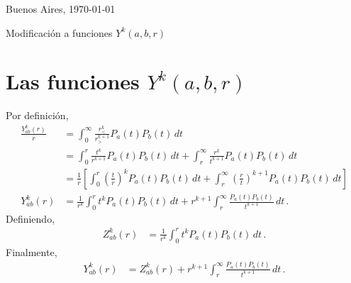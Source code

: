 \documentclass[11pt]{article}
\begin{document}
\hfill{Buenos Aires, \today} \\

\begin{center}
Modificación a funciones $Y^k(a,b,r)$ 
\end{center}

\section{Las funciones $Y^k(a,b,r)$}

Por definición,
\begin{align}
 \frac{Y_{ab}^k(r) }{r}
 &= \int_0^{\infty} \frac{r_<^k}{r_>^{k+1}}P_a(t)P_b(t)\,dt \\
 &= \int_0^r \frac{t^k}{r^{k+1}} P_a(t)P_b(t)\,dt 
  + \int_r^{\infty} \frac{r^k}{t^{k+1}} P_a(t)P_b(t)\,dt \\
 &=\frac{1}{r} \left[ \int_0^r \left(\frac{t}{r}\right)^k P_a(t)P_b(t)\,dt
  + \int_r^{\infty} \left(\frac{r}{t}\right)^{k+1} P_a(t)P_b(t)\,dt \right]\\
 Y_{ab}^k(r) 
 &= \frac{1}{r^k} \int_0^r t^k P_a(t)P_b(t)\,dt
  + r^{k+1} \int_r^{\infty} \frac{P_a(t)P_b(t)}{t^{k+1}}\,dt \,.
\end{align}
Definiendo,
\begin{align}
 Z_{ab}^k(r) &= \frac{1}{r^k} \int_0^r t^k P_a(t)P_b(t)\,dt\,.
\label{eq:Zabk}
\end{align}
Finalmente,
\begin{align}
 Y_{ab}^k(r) &= Z_{ab}^k(r) 
 + r^{k+1} \int_r^{\infty} \frac{P_a(t)P_b(t)}{t^{k+1}}\,dt \,.
\label{eq:Yabk}
\end{align}
\end{document}

